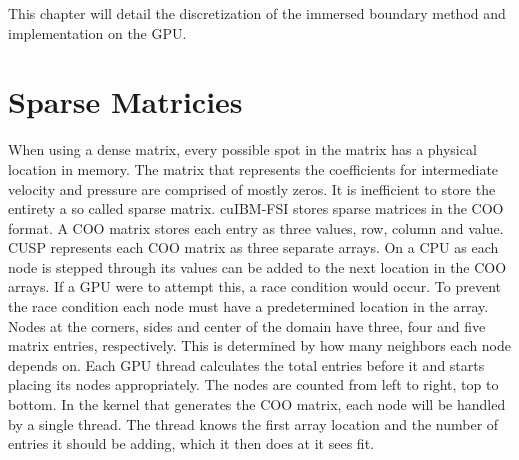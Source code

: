 \documentclass[onehalf,11pt]{beavtex}
\begin{document}
This chapter will detail the discretization of the immersed boundary method and implementation on the GPU. 

\section{Sparse Matricies}
When using a dense matrix, every possible spot in the matrix has a physical location in memory. 
The matrix that represents the coefficients for intermediate velocity and pressure are comprised of mostly zeros. 
It is inefficient to store the entirety a so called sparse matrix. 
cuIBM-FSI stores sparse matrices in the COO format. 
A COO matrix stores each entry as three values, row, column and value. 
CUSP represents each COO matrix as three separate arrays. 
On a CPU as each node is stepped through its values can be added to the next location in the COO arrays. 
If a GPU were to attempt this, a race condition would occur. 
To prevent the race condition each node must have a predetermined location in the array. 
Nodes at the corners, sides and center of the domain have three, four and five matrix entries, respectively. 
This is determined by how many neighbors each node depends on. 
Each GPU thread calculates the total entries before it and starts placing its nodes appropriately. 
The nodes are counted from left to right, top to bottom. 
In the kernel that generates the COO matrix, each node will be handled by a single thread. 
The thread knows the first array location and the number of entries it should be adding, which it then does at it sees fit.
\end{document}
